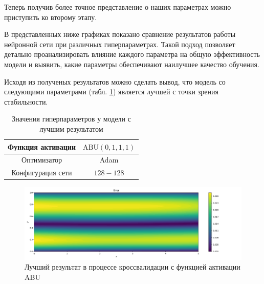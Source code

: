 Теперь получив более точное представление о наших параметрах можно приступить
ко второму этапу.

В представленных ниже графиках показано сравнение результатов работы нейронной сети
при различных гиперпараметрах. Такой подход позволяет детально проанализировать
влияние каждого параметра на общую эффективность модели и выявить, какие параметры
обеспечивают наилучшее качество обучения.







Исходя из полученых результатов можно сделать вывод, что модель со следующими
параметрами (табл. \ref{table:couette_abu_best_params}) является лучшей с точки зрения стабильности.

\begin{table}[h!]
    \centering
    \begin{tabular}{ |c|c| } 
        \hline
        Функция активации & $\text{ABU}(0, 1, 1, 1)$ \\
        \hline
        Оптимизатор & Adam \\ 
        \hline
        Конфигурация сети & $128-128$ \\ 
        \hline
    \end{tabular}
    \caption{Значения гиперпараметров у модели с лучшим результатом}
    \label{table:couette_abu_best_params}
\end{table}

\begin{figure}[ht]
    \includegraphics{data/couette_abu_error_best.png}
    \caption{Лучший результат в процессе кроссвалидации с функцией активации ABU}
    \label{fig:couette_abu_best}
\end{figure}